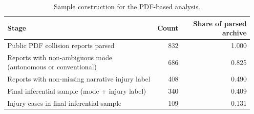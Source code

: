 \begin{table}[H]
\centering
\caption{Sample construction for the PDF-based analysis.}
\label{tab:sample_construction}
\small
\begin{tabular}{p{7.3cm}rr}
\toprule
Stage & Count & Share of parsed archive \\
\midrule
Public PDF collision reports parsed & 832 & 1.000 \\
Reports with non-ambiguous mode (autonomous or conventional) & 686 & 0.825 \\
Reports with non-missing narrative injury label & 408 & 0.490 \\
Final inferential sample (mode + injury label) & 340 & 0.409 \\
Injury cases in final inferential sample & 109 & 0.131 \\
\bottomrule
\end{tabular}
\end{table}
